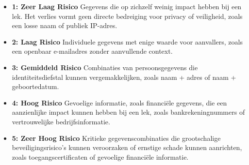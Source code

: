 \begin{itemize}
    \item \textbf{1: Zeer Laag Risico} Gegevens die op zichzelf weinig impact hebben bij een lek. Het verlies vormt geen directe bedreiging voor privacy of veiligheid, zoals een losse naam of publiek IP-adres.
    \item \textbf{2: Laag Risico} Individuele gegevens met enige waarde voor aanvallers, zoals een openbaar e-mailadres zonder aanvullende context.
    \item \textbf{3: Gemiddeld Risico} Combinaties van persoonsgegevens die identiteitsdiefstal kunnen vergemakkelijken, zoals naam + adres of naam + geboortedatum.
    \item \textbf{4: Hoog Risico} Gevoelige informatie, zoals financiële gegevens, die een aanzienlijke impact kunnen hebben bij een lek, zoals bankrekeningnummers of vertrouwelijke bedrijfsinformatie.
    \item \textbf{5: Zeer Hoog Risico} Kritieke gegevenscombinaties die grootschalige beveiligingsrisico's kunnen veroorzaken of ernstige schade kunnen aanrichten, zoals toegangscertificaten of gevoelige financiële informatie.
\end{itemize}
